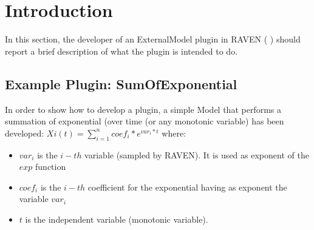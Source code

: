 \section{Introduction}
\label{sec:Introduction}
In this section, the developer of an ExternalModel plugin in RAVEN ( \cite{RAVEN}) should
report a brief description of what the plugin is intended to do.

\subsection{Example Plugin: SumOfExponential}
 In order to show how to develop a plugin, a simple Model that performs a summation
 of exponential (over time (or any monotonic variable) has been developed:
 \newline
 \begin{math}
        Xi(t)=\sum_{i=1}^{n} coef_i*e^{var_i*t}
  \end{math}
  \newline
 where:
 \begin{itemize}
    \item $var_i$ is the $i-th$ variable (sampled by RAVEN). It is used as exponent of the 
            $exp$ function
   \item $coef_i$ is the $i-th$  coefficient for the exponential having as exponent the  
            variable $var_i$
   \item $t$ is the independent variable (monotonic variable).
 \end{itemize}


